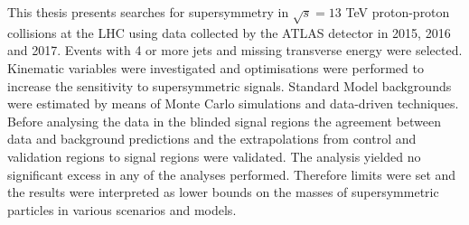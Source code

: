        \noindent This thesis presents searches for supersymmetry in $\sqrt{s}=13$ TeV proton-proton collisions at the LHC using data collected by the ATLAS detector in 2015, 2016 and 2017. Events with 4 or more jets and missing transverse energy were selected. Kinematic variables were investigated and optimisations were performed to increase the sensitivity to supersymmetric signals. Standard Model backgrounds were estimated by means of Monte Carlo simulations and data-driven techniques. Before analysing the data in the blinded signal regions the agreement between data and background predictions and the extrapolations from control and validation regions to signal regions were validated. The analysis yielded no significant excess in any of the analyses performed. Therefore limits were set and the results were interpreted as lower bounds on the masses of supersymmetric particles in various scenarios and models.

